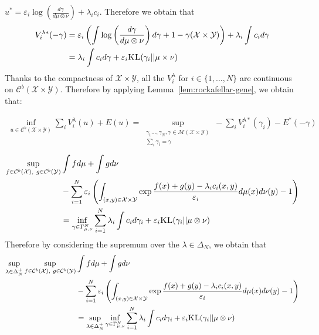 \begin{prv*}
$u^*=\varepsilon_i \log\left(\frac{d\gamma}{d\mu\otimes\nu}\right)+\lambda_i c_i$. Therefore we obtain that
\begin{align*}
 V^{\lambda*}_i(-\gamma)&=\varepsilon_i\left(\int \log\left(\frac{d\gamma}{d\mu\otimes\nu}\right)d\gamma +1- \gamma(\mathcal{X}\times\mathcal{Y})\right)+\lambda_i\int c_i d\gamma\\
 &=\lambda_i\int c_id\gamma+\varepsilon_i\textsc{KL}(\gamma_i||\mu\times\nu)
\end{align*}   
Thanks to the compactness of $\mathcal{X}\times\mathcal{Y}$, all the $V_i^{\lambda}$ for $i\in\{1,...,N\}$ are continuous on $\mathcal{C}^b(\mathcal{X}\times\mathcal{Y})$. Therefore by applying Lemma~\ref{lem:rockafellar-gene}, we obtain that:

\begin{align*}
\inf_{u\in \mathcal{C}^b(\mathcal{X}\times\mathcal{Y})} \sum_i V_i^{\lambda}(u) + E(u) = \sup\limits_{\substack{\gamma_1...,\gamma_N,\gamma\in \mathcal{M}(\mathcal{X}\times\mathcal{Y})\\\sum_i \gamma_i = \gamma}}-\sum_i V_i^{\lambda*}(\gamma_i)-E^*(-\gamma)
\end{align*}
\begin{align*}
\sup\limits_{f\in \mathcal{C}^b(\mathcal{X}),~g\in\mathcal{C}^b(\mathcal{Y})}&\int fd\mu+\int gd\nu \\
& - \sum_{i=1}^N \varepsilon_i\left(\int_{(x,y)\in\mathcal{X}\times\mathcal{Y}} \exp{\frac{f(x)+g(y)-\lambda_ic_i(x,y)}{\varepsilon_i}}d\mu(x)d\nu(y)-1\right)\\
&= \inf_{\gamma\in\Gamma^N_{\mu,\nu}} \sum_{i=1}^N \lambda_i\int c_i d\gamma_i + \varepsilon_i\textsc{KL}(\gamma_i||\mu\otimes\nu)
\end{align*}
Therefore by considering the supremum over the $\lambda\in\Delta_N$, we obtain that
\begin{align*}
 \sup_{\lambda\in\Delta^+_N}  \sup\limits_{f\in \mathcal{C}^b(\mathcal{X}),~g\in\mathcal{C}^b(\mathcal{Y})}&\int fd\mu+\int gd\nu \\
& - \sum_{i=1}^N \varepsilon_i\left(\int_{(x,y)\in\mathcal{X}\times\mathcal{Y}} \exp{\frac{f(x)+g(y)-\lambda_ic_i(x,y)}{\varepsilon_i}}d\mu(x)d\nu(y)-1\right)\\
   &=\sup_{\lambda\in\Delta^+_N}\inf_{\gamma\in\Gamma^N_{\mu,\nu}} \sum_{i=1}^N \lambda_i\int c_i d\gamma_i + \varepsilon_i \textsc{KL}(\gamma_i||\mu\otimes\nu)
\end{align*}



\end{prv*}
